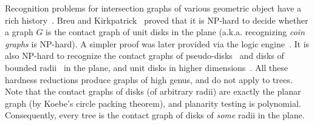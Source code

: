 Recognition problems for intersection graphs of various geometric object have a rich 
history~\cite{HK01}. Breu and Kirkpatrick~\cite{BK98} proved that it is NP-hard to decide whether a 
graph $G$ is the contact graph of unit disks in the plane (a.k.a. recognizing \emph{coin graphs} is 
NP-hard). A simpler proof was later provided via the logic engine~\cite{BET+99}. It is also NP-hard 
to recognize the contact graphs of pseudo-disks~\cite{HK01} and disks of bounded radii~\cite{BK95} 
in the plane, and unit disks in higher dimensions~\cite{Hli97,HK01}. All these hardness reductions 
produce graphs of high genus, and do not apply to trees. Note that the contact graphs of disks (of 
arbitrary radii) are exactly the planar graph (by Koebe's circle packing theorem), and planarity 
testing is polynomial. Consequently, every tree is the contact graph of disks of \emph{some} radii 
in the plane.
